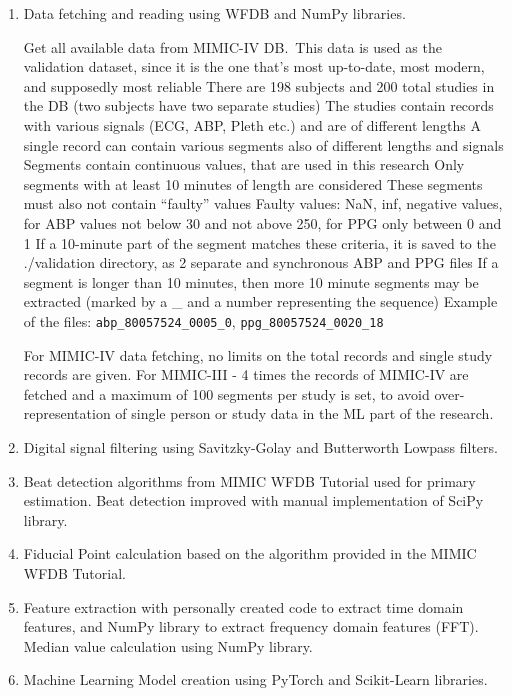 \documentclass[12pt, bibliography=totoc]{scrartcl}
\begin{document}
    \begin{enumerate}

        \item Data fetching and reading using WFDB and NumPy libraries.

        \subitem Get all available data from MIMIC-IV DB.\
        \subitem This data is used as the validation dataset, since it is the one that's most up-to-date,
        most modern, and supposedly most reliable
        \subitem There are 198 subjects and 200 total studies in the DB (two subjects have two separate studies)
        \subitem The studies contain records with various signals (ECG, ABP, Pleth etc.) and are of different lengths
        \subitem A single record can contain various segments also of different lengths and signals
        \subitem Segments contain continuous values, that are used in this research
        \subitem Only segments with at least 10 minutes of length are considered
        \subitem These segments must also not contain \enquote{faulty} values
        \subitem Faulty values: NaN, inf, negative values, for ABP values not below 30 and not above 250,
        for PPG only between 0 and 1
        \subitem If a 10-minute part of the segment matches these criteria, it is saved to the ./validation directory,
        as 2 separate and synchronous ABP and PPG files
        \subitem If a segment is longer than 10 minutes, then more 10 minute segments may be extracted
        (marked by a \_ and a number representing the sequence)
        \subitem Example of the files: \texttt{abp\_80057524\_0005\_0}, \texttt{ppg\_80057524\_0020\_18}

        For MIMIC-IV data fetching, no limits on the total records and single study records are given.
        For MIMIC-III - 4 times the records of MIMIC-IV are fetched and a maximum of 100 segments per study is set,
        to avoid over-representation of single person or study data in the ML part of the research.

        \item Digital signal filtering using Savitzky-Golay and Butterworth Lowpass filters.

        \item Beat detection algorithms from MIMIC WFDB Tutorial used for primary estimation.
        Beat detection improved with manual implementation of SciPy library.

        \item Fiducial Point calculation based on the algorithm provided in the MIMIC WFDB Tutorial.

        \item Feature extraction with personally created code to extract time domain features, and NumPy library to extract frequency domain features (FFT). Median value calculation using NumPy library.

        \item Machine Learning Model creation using PyTorch and Scikit-Learn libraries.

    \end{enumerate}
\end{document}

